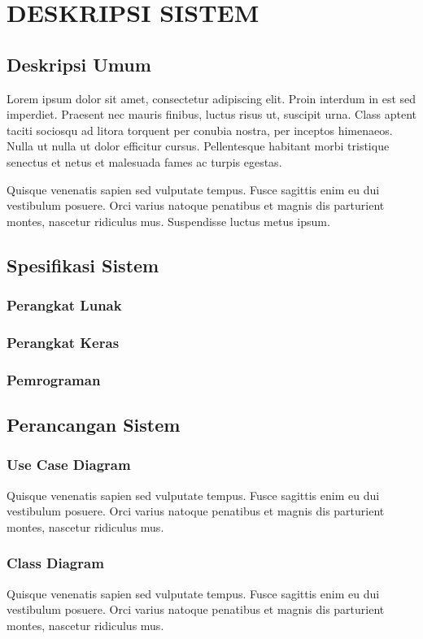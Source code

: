 \chapter{DESKRIPSI SISTEM}

\section{Deskripsi Umum}

Lorem ipsum dolor sit amet, consectetur adipiscing elit. Proin interdum in est sed imperdiet. Praesent nec mauris finibus, luctus risus ut, suscipit urna. Class aptent taciti sociosqu ad litora torquent per conubia nostra, per inceptos himenaeos. Nulla ut nulla ut dolor efficitur cursus. Pellentesque habitant morbi tristique senectus et netus et malesuada fames ac turpis egestas.

Quisque venenatis sapien sed vulputate tempus. Fusce sagittis enim eu dui vestibulum posuere. Orci varius natoque penatibus et magnis dis parturient montes, nascetur ridiculus mus. Suspendisse luctus metus ipsum.

\section{Spesifikasi Sistem}
\subsection{Perangkat Lunak}
\subsection{Perangkat Keras}
\subsection{Pemrograman}

\section{Perancangan Sistem}

\subsection{Use Case Diagram}
Quisque venenatis sapien sed vulputate tempus. Fusce sagittis enim eu dui vestibulum posuere. Orci varius natoque penatibus et magnis dis parturient montes, nascetur ridiculus mus.

\subsection{Class Diagram}
Quisque venenatis sapien sed vulputate tempus. Fusce sagittis enim eu dui vestibulum posuere. Orci varius natoque penatibus et magnis dis parturient montes, nascetur ridiculus mus.

